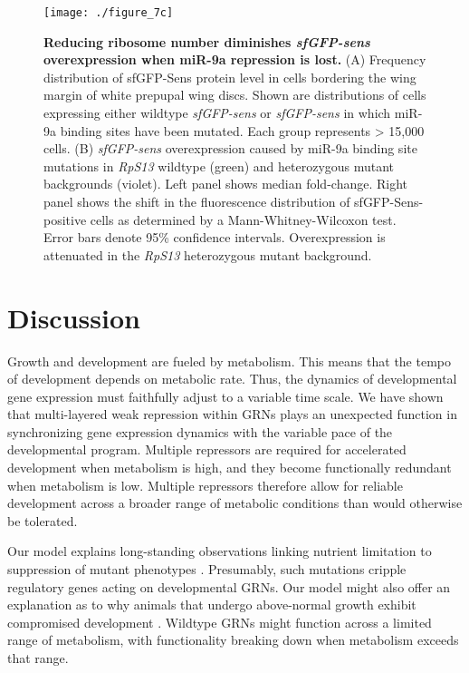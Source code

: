 \begin{figure}[h!]
\centering
\texttt{[image: ./figure\_7c]}
\caption[Reducing ribosome number diminishes \textit{sfGFP-sens} overexpression when miR-9a repression is lost.]{\textbf{Reducing ribosome number diminishes \textit{sfGFP-sens} overexpression when miR-9a repression is lost.} (A) Frequency distribution of sfGFP-Sens protein level in cells bordering the wing margin of white prepupal wing discs. Shown are distributions of cells expressing either wildtype \textit{sfGFP-sens} or \textit{sfGFP-sens} in which miR-9a binding sites have been mutated. Each group represents \textgreater{} 15,000 cells. (B) \textit{sfGFP-sens} overexpression caused by miR-9a binding site mutations in \textit{RpS13} wildtype (green) and heterozygous mutant backgrounds (violet). Left panel shows median fold-change. Right panel shows the shift in the fluorescence distribution of sfGFP-Sens-positive cells as determined by a Mann-Whitney-Wilcoxon test. Error bars denote 95\% confidence intervals. Overexpression is attenuated in the \textit{RpS13} heterozygous mutant background.}
\label{fig:metabolism:fig7c}
\end{figure}

\section{Discussion}

Growth and development are fueled by metabolism. This means that the tempo of development depends on metabolic rate. Thus, the dynamics of developmental gene expression must faithfully adjust to a variable time scale. We have shown that multi-layered weak repression within GRNs plays an unexpected function in synchronizing gene expression dynamics with the variable pace of the developmental program. Multiple repressors are required for accelerated development when metabolism is high, and they become functionally redundant when metabolism is low. Multiple repressors therefore allow for reliable development across a broader range of metabolic conditions than would otherwise be tolerated.

Our model explains long-standing observations linking nutrient limitation to suppression of mutant phenotypes \cite{Morgan1915,Morgan1929}. Presumably, such mutations cripple regulatory genes acting on developmental GRNs. Our model might also offer an explanation as to why animals that undergo above-normal growth exhibit compromised development \cite{Arendt1997,Metcalfe2001}. Wildtype GRNs might function across a limited range of metabolism, with functionality breaking down when metabolism exceeds that range.

